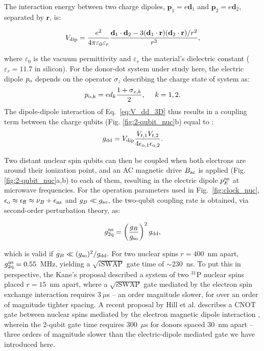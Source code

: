 \documentclass[
 aps,prb,twocolumn,
 amsmath,amssymb,superscriptaddress,
] {revtex4-1}
\begin{document}
The interaction energy between two charge dipoles, $\textbf{p}_1=e\textbf{d}_1$ and $\textbf{p}_2=e\textbf{d}_2$, separated by $\textbf{r}$, is:

\begin{equation} \label{eq:V_dd_3D}
V_{\rm dip}=\frac{e^2}{4\pi\varepsilon_0\varepsilon_r}\frac{\textbf{d}_1\cdot\textbf{d}_2-3(\textbf{d}_1\cdot\textbf{r})(\textbf{d}_2\cdot\textbf{r})/r^2}{r^3},
\end{equation}

where $\varepsilon_0$ is the vacuum permittivity and $\varepsilon_r$ the material's dielectric constant ($\varepsilon_r=11.7$ in silicon). For the donor-dot system under study here, the electric dipole $p_{\rm o}$ depends on the operator $\sigma_z$ describing the charge state of system as: 
\begin{equation}
p_{\rm o,k} = ed_k\frac{1+\sigma_{z,k}}{2},~~~~k=1,2.
\end{equation}
The dipole-dipole interaction of Eq.~\ref{eq:V_dd_3D} thus results in a coupling term between the charge qubits (Fig. \ref{fig:2-qubit_nuc}b) equal to  \cite{Tosi2017}:
\begin{equation} \label{eq:g_dd}
g_{\rm dd}=V_{\rm dip}\frac{V_{t,1}V_{t,2}}{4\epsilon_{\rm o,1}\epsilon_{\rm o,2}}.
\end{equation}

Two distant nuclear spin qubits can then be coupled when both electrons are around their ionization point, and an AC magnetic drive $B_{\rm ac}$ is applied (Fig. \ref{fig:2-qubit_nuc}a,b) to each of them, resulting in the electric dipole $p_E^{\rm ns}$ at microwave frequencies. For the operation parameters used in Fig.~\ref{fig:clock_nuc}, $\epsilon_{\rm o}\approx\epsilon_{\rm ff}\approx\nu_B+\epsilon_{\rm ns}$ and $g_B\ll g_{\rm so}$, the two-qubit coupling rate is obtained, via second-order perturbation theory, as:

\begin{equation} \label{eq:nucSWAP}
g_{\rm 2q}^{\rm ns}=\left(\frac{g_B}{g_{\rm so}}\right)^2g_{\rm dd},
\end{equation}

which is valid if $g_B\ll (g_{\rm so})^2/g_{\rm dd}$. For two nuclear spins $r=400$~nm apart, $g_{\rm 2q}^{\rm ns}=0.55$~MHz, yielding a $\sqrt{i\mathrm{SWAP}}$ gate time of $\sim230$~ns. To put this in perspective, the Kane's proposal \cite{Kane1998} described a system of  two $^{31}$P nuclear spins placed $r=15$~nm apart, where a $\sqrt{i\mathrm{SWAP}}$ gate mediated by the electron spin exchange interaction requires $3~\mu$s -- an order magnitude slower, for over an order of magnitude tighter spacing. A recent proposal by Hill et al. describes a CNOT gate between nuclear spins mediated by the electron magnetic dipole interaction \cite{Hill2015}, wherein the 2-qubit gate time requires 300~$\mu$s for donors spaced $30$~nm apart -- three orders of magnitude slower than the electric-dipole mediated gate we have introduced here.
\end{document}
